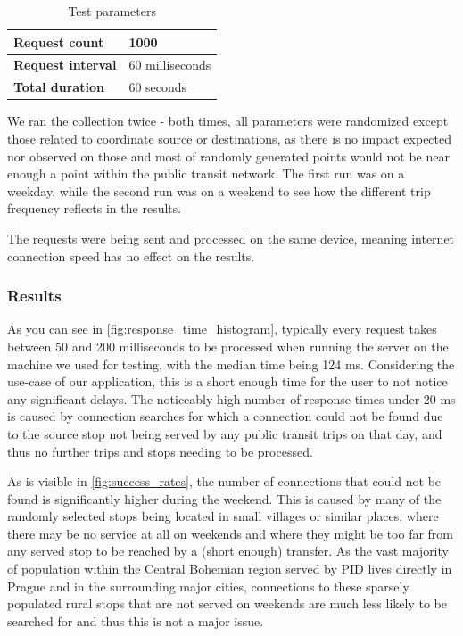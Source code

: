 \vspace{0.2cm}

\begin{table}[h!]
\centering
\begin{tabularx}{\textwidth}{|l|X|}
\hline
\textbf{Request count} & 1000 \\
\hline
\textbf{Request interval} & 60 milliseconds \\
\hline
\textbf{Total duration} & 60 seconds \\
\hline
\end{tabularx}
\caption{Test parameters}
\label{tab:test_parameters}
\end{table}

We ran the collection twice - both times, all parameters were randomized except those related to coordinate source or destinations, as there is no impact expected nor observed on those and most of randomly generated points would not be near enough a point within the public transit network. The first run was on a weekday, while the second run was on a weekend to see how the different trip frequency reflects in the results.

The requests were being sent and processed on the same device, meaning internet connection speed has no effect on the results.


\subsubsection{Results}

As you can see in \cref{fig:response_time_histogram}, typically every request takes between 50 and 200 milliseconds to be processed when running the server on the machine we used for testing, with the median time being 124 ms. Considering the use-case of our application, this is a short enough time for the user to not notice any significant delays. The noticeably high number of response times under 20 ms is caused by connection searches for which a connection could not be found due to the source stop not being served by any public transit trips on that day, and thus no further trips and stops needing to be processed.

As is visible in \cref{fig:success_rates}, the number of connections that could not be found is significantly higher during the weekend. This is caused by many of the randomly selected stops being located in small villages or similar places, where there may be no service at all on weekends and where they might be too far from any served stop to be reached by a (short enough) transfer. As the vast majority of population within the Central Bohemian region served by PID lives directly in Prague and in the surrounding major cities, connections to these sparsely populated rural stops that are not served on weekends are much less likely to be searched for and thus this is not a major issue.


